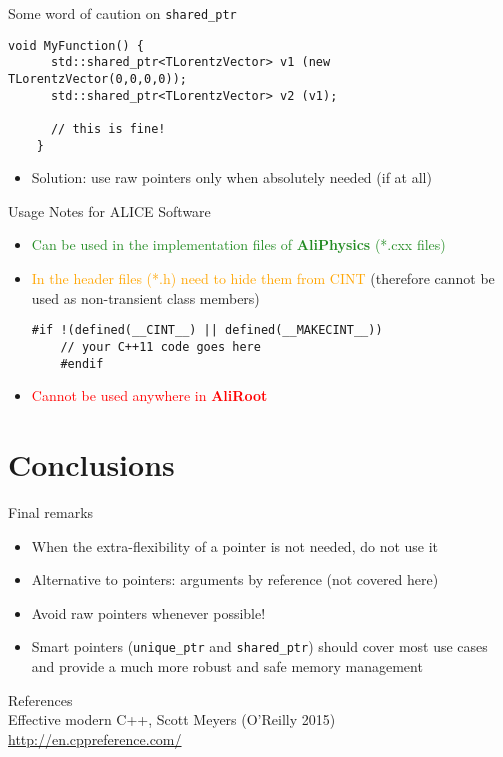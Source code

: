 \documentclass[xcolor={usenames,dvipsnames}]{beamer}
\begin{document}
\begin{frame}[fragile]{Some word of caution on \texttt{shared\_ptr}}
\scriptsize
\begin{lstlisting}[style=base, gobble=4]
    void MyFunction() {
      std::shared_ptr<TLorentzVector> v1 (new TLorentzVector(0,0,0,0));
      std::shared_ptr<TLorentzVector> v2 (v1);
  
      // this is fine!
    }
\end{lstlisting}
\small
\begin{itemize}
\item Solution: use raw pointers only when absolutely needed (if at all)
\end{itemize}
\end{frame}

\begin{frame}[fragile]{Usage Notes for ALICE Software}
\begin{itemize}
\item \textcolor{ForestGreen}{Can be used in the implementation files of \textbf{AliPhysics} (*.cxx files)}
\item \textcolor{orange}{In the header files (*.h) need to hide them from CINT} (therefore cannot be used as non-transient class members) \\
{\scriptsize
\begin{lstlisting}[style=base, gobble=4]
    #if !(defined(__CINT__) || defined(__MAKECINT__))
    // your C++11 code goes here
    #endif
\end{lstlisting}
}
\item \textcolor{red}{Cannot be used anywhere in \textbf{AliRoot}}
\end{itemize}
\end{frame}

\section{Conclusions}

\begin{frame}[fragile]{Final remarks}
\begin{itemize}
\item When the extra-flexibility of a pointer is not needed, do not use it
\item Alternative to pointers: arguments by reference (not covered here)
\item Avoid raw pointers whenever possible!
\item Smart pointers (\texttt{unique\_ptr} and \texttt{shared\_ptr}) should cover most use cases and provide
a much more robust and safe memory management
\end{itemize}
References \\
Effective modern C++, Scott Meyers (O'Reilly 2015) \\
\href{http://en.cppreference.com/}{http://en.cppreference.com/}
\end{frame}
\end{document}
